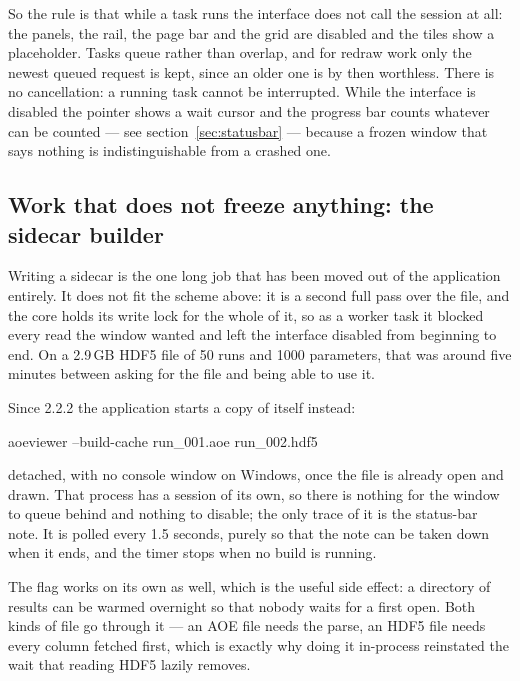 \documentclass[11pt,a4paper,oneside]{report}
\newcommand{\appver}{2.2.2}
\begin{document}
So the rule is that while a task runs the interface does not call the session at
all: the panels, the rail, the page bar and the grid are disabled and the tiles
show a placeholder. Tasks queue rather than overlap, and for redraw work only
the newest queued request is kept, since an older one is by then worthless.
There is no cancellation: a running task cannot be interrupted. While the
interface is disabled the pointer shows a wait cursor and the progress bar
counts whatever can be counted --- see section~\ref{sec:statusbar} --- because
a frozen window that says nothing is indistinguishable from a crashed one.

\subsection{Work that does not freeze anything: the sidecar builder}
\label{sec:sidecar-writer}

Writing a sidecar is the one long job that has been moved out of the
application entirely. It does not fit the scheme above: it is a second full pass
over the file, and the core holds its write lock for the whole of it, so as a
worker task it blocked every read the window wanted and left the interface
disabled from beginning to end. On a 2.9\,GB HDF5 file of 50 runs and 1000
parameters, that was around five minutes between asking for the file and being
able to use it.

Since \appver{} the application starts a copy of itself instead:

\begin{aoecode}
aoeviewer --build-cache run_001.aoe run_002.hdf5
\end{aoecode}

detached, with no console window on Windows, once the file is already open and
drawn. That process has a session of its own, so there is nothing for the window
to queue behind and nothing to disable; the only trace of it is the status-bar
note. It is polled every 1.5 seconds, purely so that the note can be taken down
when it ends, and the timer stops when no build is running.

The flag works on its own as well, which is the useful side effect: a directory
of results can be warmed overnight so that nobody waits for a first open. Both
kinds of file go through it --- an AOE file needs the parse, an HDF5 file needs
every column fetched first, which is exactly why doing it in-process reinstated
the wait that reading HDF5 lazily removes.
\end{document}
